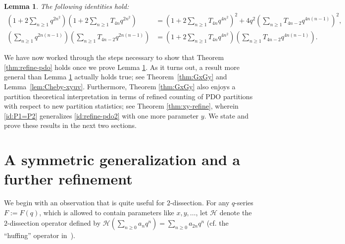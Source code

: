 \documentclass[11pt,reqno]{amsart}
\numberwithin{equation}{section}
\theoremstyle{plain}
\newtheorem{lemma}[theorem]{Lemma}
\theoremstyle{definition}
\theoremstyle{named}
\def\cH{\mathcal{H}}
\begin{document}
\begin{lemma}\label{lem:main 2-dis}
The following identities hold:
\begin{align*}
\left(1+2\sum_{n\ge 1}q^{2n^2}\right)\left(1+2\sum_{n\ge 1}T_{4n}q^{2n^2}\right) &= \left(1+2\sum_{n\ge 1}T_{4n}q^{4n^2}\right)^2+4q^2\left(\sum_{n\ge 1}T_{4n-2}q^{4n(n-1)}\right)^2,\\
\left(\sum_{n\ge 1}q^{2n(n-1)}\right)\left(\sum_{n\ge 1}T_{4n-2}q^{2n(n-1)}\right) &= \left(1+2\sum_{n\ge 1}T_{4n}q^{4n^2}\right)\left(\sum_{n\ge 1}T_{4n-2}q^{4n(n-1)}\right).
\end{align*}
\end{lemma}

We have now worked through the steps necessary to show that Theorem \ref{thm:refine-pdo} holds once we prove Lemma \ref{lem:main 2-dis}. As it turns out, a result more general than Lemma \ref{lem:main 2-dis} actually holds true; see Theorem~\ref{thm:GxGy} and Lemma~\ref{lem:Cheby-xyuv}. Furthermore, Theorem \ref{thm:GxGy} also enjoys a partition theoretical interpretation in terms of refined counting of PDO partitions with respect to new partition statistics; see Theorem \ref{thm:xy-refine}, wherein \eqref{id:P1=P2} generalizes \eqref{id:refine-pdo2} with one more parameter $y$. We state and prove these results in the next two  sections.  



\section{A symmetric generalization and a further refinement}

We begin with an observation that is quite useful for $2$-dissection. For any $q$-series $F:=F(q)$, which is allowed to  contain parameters like $x,y,\ldots$, let $\cH$ denote the $2$-dissection operator defined by $\cH\left( \sum_{n\geq 0} a_nq^n\right) = \sum_{n\geq 0}a_{2n}q^n$ (cf. the ``huffing'' operator in~\cite[Sect.~6.3]{Hir}).
\end{document}
